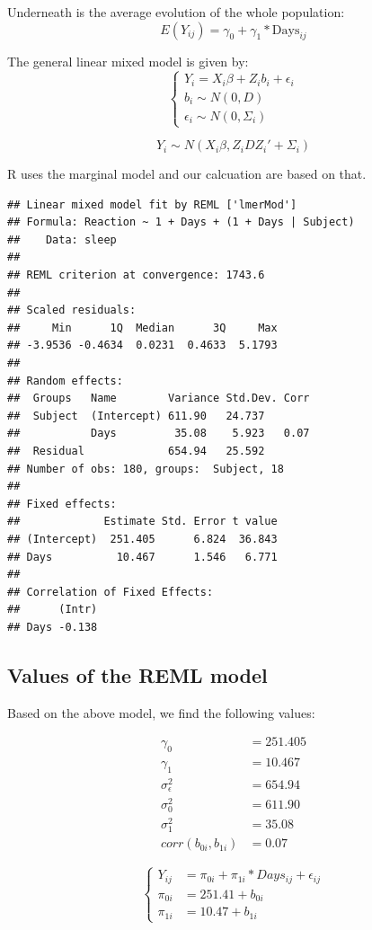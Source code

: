 \documentclass[
]{article}
\begin{document}
Underneath is the average evolution of the whole population:
\[E(Y_{ij}) = \gamma_{0} + \gamma_{1}* \text{Days}_{ij} \tag{6}\]

The general linear mixed model is given by: \[\begin{cases}
Y_i = X_i\beta + Z_i b_i + \epsilon_i \\
b_i \sim N(0,D)\\
\epsilon_i \sim N(0,\Sigma_i)
\end{cases}\tag{7}\]

\[Y_i \sim N(X_i\beta, Z_iDZ_i'+\Sigma_i) \tag{8}\]

R uses the marginal model and our calcuation are based on that.

\begin{verbatim}
## Linear mixed model fit by REML ['lmerMod']
## Formula: Reaction ~ 1 + Days + (1 + Days | Subject)
##    Data: sleep
## 
## REML criterion at convergence: 1743.6
## 
## Scaled residuals: 
##     Min      1Q  Median      3Q     Max 
## -3.9536 -0.4634  0.0231  0.4633  5.1793 
## 
## Random effects:
##  Groups   Name        Variance Std.Dev. Corr
##  Subject  (Intercept) 611.90   24.737       
##           Days         35.08    5.923   0.07
##  Residual             654.94   25.592       
## Number of obs: 180, groups:  Subject, 18
## 
## Fixed effects:
##             Estimate Std. Error t value
## (Intercept)  251.405      6.824  36.843
## Days          10.467      1.546   6.771
## 
## Correlation of Fixed Effects:
##      (Intr)
## Days -0.138
\end{verbatim}

\hypertarget{values-of-the-reml-model}{%
\subsection{Values of the REML model}\label{values-of-the-reml-model}}

Based on the above model, we find the following values:

\[\begin{aligned}
\gamma_{0}  &= 251.405 \\
\gamma_{1}  &= 10.467  \\
\sigma_{\epsilon}^{2} &= 654.94 \\
\sigma_{0}^{2} &= 611.90 \\
\sigma_{1}^{2} &= 35.08 \\
corr(b_{0i}, b_{1i}) &= 0.07
\end{aligned} \tag{9}\]

\[
\begin{cases}
Y_{ij}   &= \pi_{0i} + \pi_{1i}* Days_{ij} + \epsilon_{ij} \\
\pi_{0i} &= 251.41 + b_{0i} \\
\pi_{1i} &= 10.47 + b_{1i}
\end{cases} \tag{10}
\]
\end{document}
